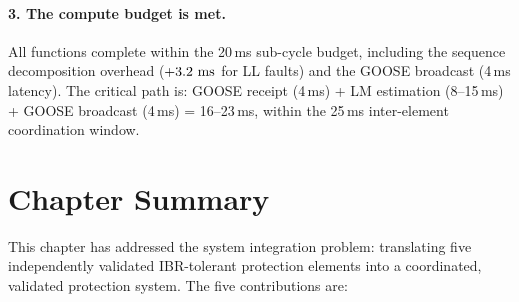 \paragraph{3. The compute budget is met.}  All functions complete within
the 20\,ms sub-cycle budget, including the sequence decomposition overhead
($+3.2\,\,\mathrm{ms}$ for LL faults) and the GOOSE broadcast (4\,ms latency).
The critical path is: GOOSE receipt (4\,ms) + LM estimation (8--15\,ms) +
GOOSE broadcast (4\,ms) = 16--23\,ms, within the 25\,ms inter-element
coordination window.

\section{Chapter Summary}
\label{sec:ch7_summary}

This chapter has addressed the system integration problem: translating five
independently validated IBR-tolerant protection elements into a coordinated,
validated protection system.  The five contributions are:

